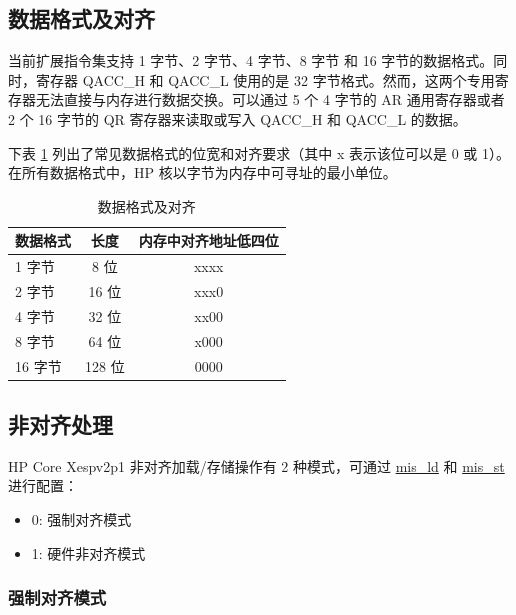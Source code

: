 \documentclass[main\_\_CN.tex]{subfiles}
\begin{document}
\subsection{数据格式及对齐}
\label{sec:pie-data-align}

当前扩展指令集支持 1 字节、2 字节、4 字节、8 字节 和 16 字节的数据格式。同时，寄存器 QACC\_H 和 QACC\_L 使用的是 32 字节格式。然而，这两个专用寄存器无法直接与内存进行数据交换。可以通过 5 个 4 字节的 AR 通用寄存器或者 2 个 16 字节的 QR 寄存器来读取或写入 QACC\_H 和 QACC\_L 的数据。

下表 \ref{tab:pie_data_format_align} 列出了常见数据格式的位宽和对齐要求（其中 x 表示该位可以是 0 或 1）。在所有数据格式中，HP 核以字节为内存中可寻址的最小单位。

\begin{table}[H]
\centering
\caption{数据格式及对齐}
\label{tab:pie_data_format_align}
\begin{tabular}{|l|c|c|}
\hline
    \rowcolor{lightgray}
    \textbf{数据格式}  & \textbf{长度} & \textbf{内存中对齐地址低四位} \\\hline

    1 字节 & 8 位 & xxxx \\\hline
    2 字节 & 16 位 & xxx0 \\\hline
    4 字节 & 32 位 & xx00 \\\hline
    8 字节 & 64 位 & x000 \\\hline
    16 字节 & 128 位 & 0000 \\\hline
    \end{tabular}
\end{table}

\subsection{非对齐处理}

\chipname{} HP Core Xespv2p1 非对齐加载/存储操作有 2 种模式，可通过 \hyperref[mis_ld]{mis\_ld} 和 \hyperref[mis_st]{mis\_st} 进行配置：
\begin{itemize}
    \item 0: 强制对齐模式
    \item 1: 硬件非对齐模式
\end{itemize}



\subsubsection{强制对齐模式}
\end{document}
